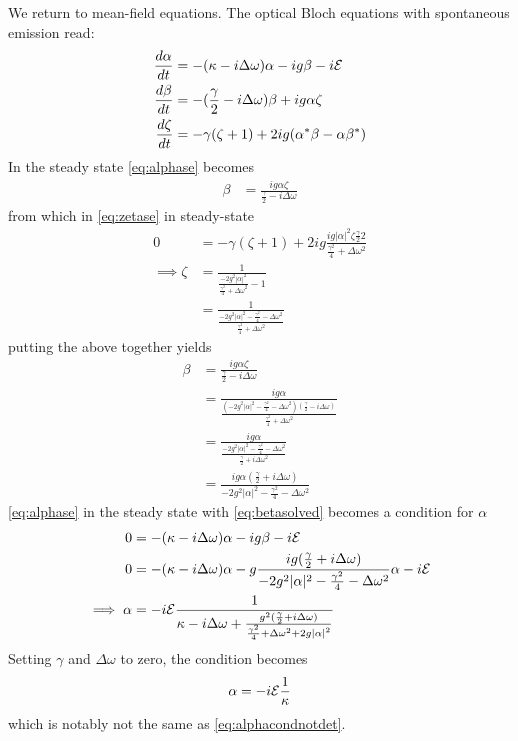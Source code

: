 We return to mean-field equations. The optical Bloch equations with spontaneous emission read:
\begin{align}
\frac{d \alpha}{dt} &= -(\kappa - i \Delta \omega)\alpha - ig \beta - i\mathcal{E}\label{eq:alphase}\\
\frac{d \beta}{dt} &= -(\frac{\gamma}{2}-i\Delta\omega)\beta+ig\alpha\zeta \label{eq:betase}\\
\frac{d\zeta}{dt} &= -\gamma (\zeta +1)+2ig(\alpha^*\beta-\alpha\beta^*) \label{eq:zetase}
\end{align}
In the steady state \cref{eq:alphase} becomes
\begin{align}
  \beta &= \frac{ig\alpha\zeta}{\frac{\gamma}{2}-i\Delta\omega}
\end{align}
from which in \cref{eq:zetase} in steady-state
\begin{align}
  0 &= -\gamma(\zeta+1)+2ig\frac{ig|\alpha|^2\zeta\frac{\gamma}{2}2}{\frac{\gamma^2}{4}+\Delta\omega^2} \\
  \implies \zeta &= \frac{1}{\frac{-2g^2|\alpha|^2}{\frac{\gamma^2}{4} +\Delta\omega^2}-1} \\
  &= \frac{1}{\frac{-2g^2|\alpha|^2 - \frac{\gamma^2}{4}-\Delta\omega^2}{\frac{\gamma^2}{4} +\Delta\omega^2}}
\end{align}
putting the above together yields
\begin{align}
  \beta &= \frac{ig\alpha\zeta}{\frac{\gamma}{2}-i\Delta\omega}\\
  &= \frac{ig\alpha}{\frac{(-2g^2|\alpha|^2-\frac{\gamma^2}{4}-\Delta\omega^2)(\frac{\gamma}{2}-i\Delta\omega)}{\frac{\gamma^2}{4}+\Delta\omega^2}}\\
  &= \frac{ig\alpha}{\frac{-2g^2|\alpha|^2-\frac{\gamma^2}{4}-\Delta\omega^2}{\frac{\gamma}{2}+i\Delta\omega^2}}\\
  &= \frac{ig\alpha(\frac{\gamma}{2}+i\Delta\omega)}{-2g^2|\alpha|^2-\frac{\gamma^2}{4}-\Delta\omega^2} \label{eq:betasolved}
\end{align}
\cref{eq:alphase} in the steady state with  \cref{eq:betasolved} becomes a condition for $\alpha$
\begin{align} %
0&=-(\kappa-i\Delta\omega)\alpha-ig\beta-i\Epsilon \\
0&=-{(\kappa-i\Delta\omega)}\alpha-g\frac{ig(\frac{\gamma}{2}+i\Delta\omega)}{-2g^2|\alpha|^2-\frac{\gamma^2}{4}-\Delta\omega^2}\alpha-i\Epsilon \\
\implies \alpha &= -i\Epsilon \frac{1}{\kappa-i\Delta\omega+\frac{g^2(\frac{\gamma}{2}+i\Delta\omega)}{\frac{\gamma^2}{4}+{\Delta\omega}^2+2g{|\alpha|}^2}}\label{eq:alphadetdiss}
\end{align}
Setting $\gamma$ and $\Delta\omega$ to zero, the condition becomes
\begin{equation}
  \alpha = -i\mathcal{E}\frac{1}{\kappa}
\end{equation}
which is notably not the same as \cref{eq:alphacondnotdet}.

